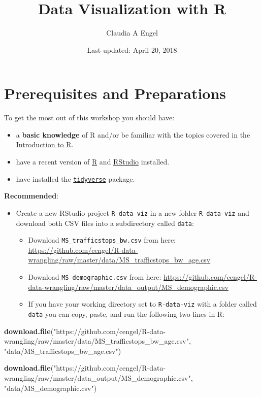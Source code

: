 \documentclass[]{book}
\title{Data Visualization with R}
\author{Claudia A Engel}
\date{Last updated: April 20, 2018}
\newenvironment{Shaded}{\begin{snugshade}}{\end{snugshade}}
\newcommand{\KeywordTok}[1]{\textcolor[rgb]{0.13,0.29,0.53}{\textbf{#1}}}
\newcommand{\StringTok}[1]{\textcolor[rgb]{0.31,0.60,0.02}{#1}}
\newcommand{\NormalTok}[1]{#1}
\providecommand{\tightlist}{%
  \setlength{\itemsep}{0pt}\setlength{\parskip}{0pt}}
\theoremstyle{definition}
\theoremstyle{definition}
\theoremstyle{definition}
\theoremstyle{remark}
\begin{document}
\maketitle

{
\setcounter{tocdepth}{1}
\tableofcontents
}
\chapter*{Prerequisites and
Preparations}\label{prerequisites-and-preparations}

To get the most out of this workshop you should have:

\begin{itemize}
\tightlist
\item
  a \textbf{basic knowledge} of R and/or be familiar with the topics
  covered in the \href{https://cengel.github.io/R-intro/}{Introduction
  to R}.
\item
  have a recent version of \href{https://cran.r-project.org/}{R} and
  \href{https://www.rstudio.com/}{RStudio} installed.
\item
  have installed the \href{http://tidyverse.org/}{\texttt{tidyverse}}
  package.
\end{itemize}

\textbf{Recommended}:

\begin{itemize}
\tightlist
\item
  Create a new RStudio project \texttt{R-data-viz} in a new folder
  \texttt{R-data-viz} and download both CSV files into a subdirectory
  called \texttt{data}:

  \begin{itemize}
  \tightlist
  \item
    Download \texttt{MS\_trafficstops\_bw.csv} from here:
    \url{https://github.com/cengel/R-data-wrangling/raw/master/data/MS_trafficstops_bw_age.csv}
  \item
    Download \texttt{MS\_demographic.csv} from here:
    \url{https://github.com/cengel/R-data-wrangling/raw/master/data_output/MS_demographic.csv}
  \item
    If you have your working directory set to \texttt{R-data-viz} with a
    folder called \texttt{data} you can copy, paste, and run the
    following two lines in R:
  \end{itemize}
\end{itemize}

\begin{Shaded}
\begin{Highlighting}[]
\KeywordTok{download.file}\NormalTok{(}\StringTok{"https://github.com/cengel/R-data-wrangling/raw/master/data/MS_trafficstops_bw_age.csv"}\NormalTok{, }\StringTok{"data/MS_trafficstops_bw_age.csv"}\NormalTok{)}

\KeywordTok{download.file}\NormalTok{(}\StringTok{"https://github.com/cengel/R-data-wrangling/raw/master/data_output/MS_demographic.csv"}\NormalTok{, }\StringTok{"data/MS_demographic.csv"}\NormalTok{)}
\end{Highlighting}
\end{Shaded}
\end{document}
